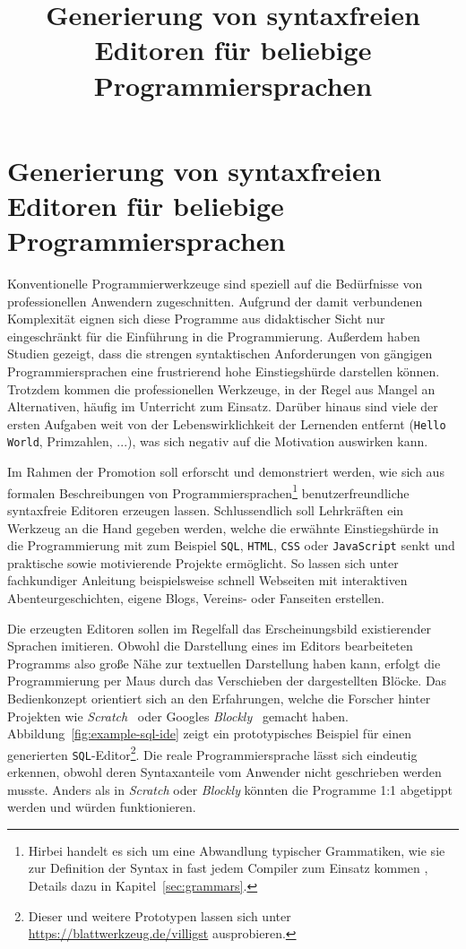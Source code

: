 \documentclass[paper=a4,fontsize=11pt,parskip=half]{scrartcl}
\title{Generierung von syntaxfreien Editoren für beliebige Programmiersprachen}
\begin{document}
\pagestyle{empty}
\section{Generierung von syntaxfreien Editoren für beliebige Programmiersprachen}

Konventionelle Programmierwerkzeuge sind speziell auf die Bedürfnisse von professionellen Anwendern zugeschnitten. Aufgrund der damit verbundenen Komplexität eignen sich diese Programme aus didaktischer Sicht nur eingeschränkt für die Einführung in die Programmierung. Außerdem haben Studien gezeigt, dass die strengen syntaktischen Anforderungen von gängigen Programmiersprachen eine frustrierend hohe Einstiegshürde darstellen können\cite{resnick_scratch:_2009}. Trotzdem kommen die professionellen Werkzeuge, in der Regel aus Mangel an Alternativen, häufig im Unterricht zum Einsatz. Darüber hinaus sind viele der ersten Aufgaben weit von der Lebenswirklichkeit der Lernenden entfernt (\texttt{Hello World}, Primzahlen, ...), was sich negativ auf die Motivation auswirken kann\cite{resnick_scratch:_2009}.

Im Rahmen der Promotion soll erforscht und demonstriert werden, wie sich aus formalen Beschreibungen von Programmiersprachen\footnote{Hirbei handelt es sich um eine Abwandlung typischer Grammatiken, wie sie zur Definition der Syntax in fast jedem Compiler zum Einsatz kommen \cite[S. 42ff]{aho_compilers:_2007}, Details dazu in Kapitel~\ref{sec:grammars}.} benutzerfreundliche syntaxfreie Editoren erzeugen lassen. Schlussendlich soll Lehrkräften ein Werkzeug an die Hand gegeben werden, welche die erwähnte Einstiegshürde in die Programmierung mit zum Beispiel \texttt{SQL}, \texttt{HTML}, \texttt{CSS} oder \texttt{JavaScript} senkt und praktische sowie motivierende Projekte ermöglicht. So lassen sich unter fachkundiger Anleitung beispielsweise schnell Webseiten mit interaktiven Abenteurgeschichten, eigene Blogs, Vereins- oder Fanseiten erstellen.

Die erzeugten Editoren sollen im Regelfall das Erscheinungsbild existierender Sprachen imitieren. Obwohl die Darstellung eines im Editors bearbeiteten Programms also große Nähe zur textuellen Darstellung haben kann, erfolgt die Programmierung per Maus durch das Verschieben der dargestellten Blöcke. Das Bedienkonzept orientiert sich an den Erfahrungen, welche die Forscher hinter Projekten wie \textit{Scratch}~\cite{maloney_scratch:_2004} oder Googles \textit{Blockly}~\cite{fraser_ten_2015} gemacht haben. Abbildung~\ref{fig:example-sql-ide} zeigt ein prototypisches Beispiel für einen generierten \texttt{SQL}-Editor\footnote{Dieser und weitere Prototypen lassen sich unter \url{https://blattwerkzeug.de/villigst} ausprobieren.}. Die reale Programmiersprache lässt sich eindeutig erkennen, obwohl deren Syntaxanteile vom Anwender nicht geschrieben werden musste. Anders als in \textit{Scratch} oder \textit{Blockly} könnten die Programme 1:1 abgetippt werden und würden funktionieren.
\end{document}
